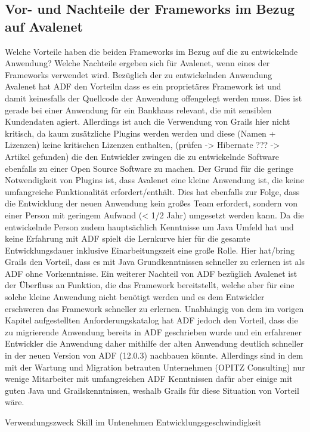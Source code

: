 \subsection{Vor- und Nachteile der Frameworks im Bezug auf Avalenet}
Welche Vorteile haben die beiden Frameworks im Bezug auf die zu entwickelnde Anwendung?
Welche Nachteile ergeben sich für Avalenet, wenn eines der Frameworks verwendet wird.
Bezüglich der zu entwickelnden Anwendung Avalenet hat ADF den Vorteilm dass es ein proprietäres Framework ist und damit keinesfalls der Quellcode der Anwendung offengelegt werden muss. Dies ist gerade bei einer Anwendung für ein Bankhaus relevant, die mit sensiblen Kundendaten agiert. Allerdings ist auch die Verwendung von Grails hier nicht kritisch, da kaum zusätzliche Plugins werden werden und diese (Namen + Lizenzen) keine kritischen Lizenzen enthalten, (prüfen -> Hibernate ??? -> Artikel gefunden) die den Entwickler zwingen die zu entwickelnde Software ebenfalls zu einer Open Source Software zu machen. Der Grund für die geringe Notwendigkeit von Plugins ist, dass Avalenet eine kleine Anwendung ist, die keine umfangreiche Funktionalität erfordert/enthält. Dies hat ebenfalls zur Folge, dass die Entwicklung der neuen Anwendung kein großes Team erfordert, sondern von einer Person mit geringem Aufwand (< 1/2 Jahr) umgesetzt werden kann. Da die entwickelnde Person zudem hauptsächlich Kenntnisse um Java Umfeld hat und keine Erfahrung mit ADF spielt die Lernkurve hier für die gesamte Entwicklungsdauer inklusive Einarbeitungszeit eine große Rolle. Hier hat/bring Grails den Vorteil, dass es mit Java Grundkenntnissen schneller zu erlernen ist als ADF ohne Vorkenntnisse. Ein weiterer Nachteil von ADF bezüglich Avalenet ist der Überfluss an Funktion, die das Framework bereitstellt, welche aber für eine solche kleine Anwendung nicht benötigt werden und es dem Entwickler erschweren das Framework schneller zu erlernen. Unabhängig von dem im vorigen Kapitel aufgestellten Anforderungskatalog hat ADF jedoch den Vorteil, dass die zu migrierende Anwendung bereits in ADF geschrieben wurde und ein erfahrener Entwickler die Anwendung daher mithilfe der alten Anwendung deutlich schneller in der neuen Version von ADF (12.0.3) nachbauen könnte. Allerdings sind in dem mit der Wartung und Migration betrauten Unternehmen (OPITZ Consulting) nur wenige Mitarbeiter mit umfangreichen ADF Kenntnissen dafür aber einige mit guten Java und Grailskenntnissen, weshalb Grails für diese Situation von Vorteil wäre.

Verwendungszweck
Skill im Untenehmen
Entwicklungsgeschwindigkeit

